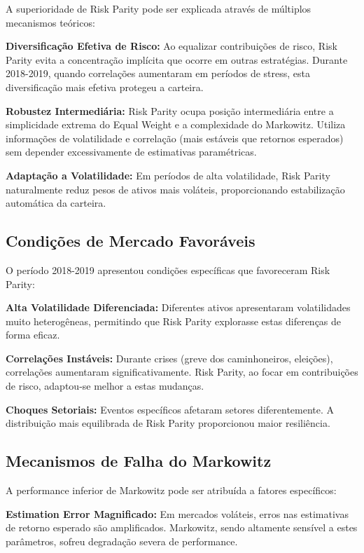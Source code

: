 A superioridade de Risk Parity pode ser explicada através de múltiplos mecanismos teóricos:

\textbf{Diversificação Efetiva de Risco:} Ao equalizar contribuições de risco, Risk Parity evita a concentração implícita que ocorre em outras estratégias. Durante 2018-2019, quando correlações aumentaram em períodos de stress, esta diversificação mais efetiva protegeu a carteira.

\textbf{Robustez Intermediária:} Risk Parity ocupa posição intermediária entre a simplicidade extrema do Equal Weight e a complexidade do Markowitz. Utiliza informações de volatilidade e correlação (mais estáveis que retornos esperados) sem depender excessivamente de estimativas paramétricas.

\textbf{Adaptação a Volatilidade:} Em períodos de alta volatilidade, Risk Parity naturalmente reduz pesos de ativos mais voláteis, proporcionando estabilização automática da carteira.

\subsection{Condições de Mercado Favoráveis}

O período 2018-2019 apresentou condições específicas que favoreceram Risk Parity:

\textbf{Alta Volatilidade Diferenciada:} Diferentes ativos apresentaram volatilidades muito heterogêneas, permitindo que Risk Parity explorasse estas diferenças de forma eficaz.

\textbf{Correlações Instáveis:} Durante crises (greve dos caminhoneiros, eleições), correlações aumentaram significativamente. Risk Parity, ao focar em contribuições de risco, adaptou-se melhor a estas mudanças.

\textbf{Choques Setoriais:} Eventos específicos afetaram setores diferentemente. A distribuição mais equilibrada de Risk Parity proporcionou maior resiliência.

\subsection{Mecanismos de Falha do Markowitz}

A performance inferior de Markowitz pode ser atribuída a fatores específicos:

\textbf{Estimation Error Magnificado:} Em mercados voláteis, erros nas estimativas de retorno esperado são amplificados. Markowitz, sendo altamente sensível a estes parâmetros, sofreu degradação severa de performance.

